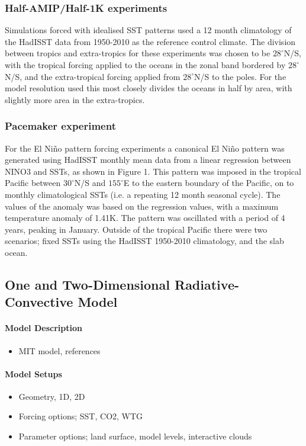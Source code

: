\subsubsection{Half-AMIP/Half-1K experiments}
Simulations forced with idealised SST patterns used a 12 month climatology of 
the HadISST data from 1950-2010 as the reference control climate. The division 
between tropics and extra-tropics for these experiments was chosen to be 
$28^{\circ}$N/S, with the tropical forcing applied to the oceans in the zonal 
band bordered by $28^{\circ}$N/S, and the extra-tropical forcing applied from 
$28^{\circ}$N/S to the poles. For the model resolution used this most closely 
divides the oceans in half by area, with slightly more area in the 
extra-tropics.

\subsubsection{Pacemaker experiment}
For the El Ni{\~n}o pattern forcing experiments a canonical El Ni{\~n}o pattern 
was generated using HadISST monthly mean data from a linear regression between 
NINO3 and SSTs, as shown in Figure 1. This pattern was imposed in the tropical 
Pacific between $30^{\circ}$N/S and $155^{\circ}$E to the eastern boundary of 
the Pacific, on to monthly climatological SSTs (i.e. a repeating 12 month 
seasonal cycle).  The values of the anomaly was based on the regression values, 
with a maximum temperature anomaly of 1.41K.  The pattern was oscillated with a 
period of 4 years, peaking in January.  Outside of the tropical Pacific there 
were two scenarios; fixed SSTs using the HadISST 1950-2010 climatology, and the 
slab ocean. 



\subsection{One and Two-Dimensional Radiative-Convective Model}

\paragraph{Model Description}
\begin{itemize}
	\item MIT model, references
\end{itemize}

\paragraph{Model Setups}
\begin{itemize}
	\item Geometry, 1D, 2D
	\item Forcing options; SST, CO2, WTG
	\item Parameter options; land surface, model levels, interactive clouds
\end{itemize}

